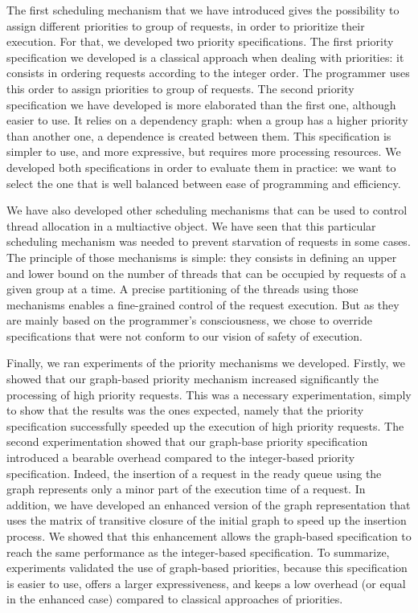 \documentclass[11pt]{report}
\begin{document}
The first scheduling mechanism that we have introduced gives the possibility to assign different priorities to group of requests, in order to prioritize their execution. For that, we developed two priority specifications. The first priority specification we developed is a classical approach when dealing with priorities: it consists in ordering requests according to the integer order. The programmer uses this order to assign priorities to group of requests. The second priority specification we have developed is more elaborated than the first one, although easier to use. It relies on a dependency graph: when a group has a higher priority than another one, a dependence is created between them. This specification is simpler to use, and more expressive, but requires more processing resources. We developed both specifications in order to evaluate them in practice: we want to select the one that is well balanced between ease of programming and efficiency.

We have also developed other scheduling mechanisms that can be used to control thread allocation in a multiactive object. We have seen that this particular scheduling mechanism was needed to prevent starvation of requests in some cases. The principle of those mechanisms is simple: they consists in defining an upper and lower bound on the number of threads that can be occupied by requests of a given group at a time. A precise partitioning of the threads using those mechanisms enables a fine-grained control of the request execution. But as they are mainly based on the programmer's consciousness, we chose to override specifications that were not conform to our vision of safety of execution.

Finally, we ran experiments of the priority mechanisms we developed. Firstly, we showed that our graph-based priority mechanism increased significantly the processing of high priority requests. This was a necessary experimentation, simply to show that the results was the ones expected, namely that the priority specification successfully speeded up the execution of high priority requests. The second experimentation showed that our graph-base priority specification introduced a bearable overhead compared to the integer-based priority specification. Indeed, the insertion of a request in the ready queue using the graph represents only a minor part of the execution time of a request. In addition, we have developed an enhanced version of the graph representation that uses the matrix of transitive closure of the initial graph to speed up the insertion process. We showed that this enhancement allows the graph-based specification to reach the same performance as the integer-based specification. To summarize, experiments validated the use of graph-based priorities, because this specification is easier to use, offers a larger expressiveness, and keeps a low overhead (or equal in the enhanced case) compared to classical approaches of priorities. 
\end{document}
